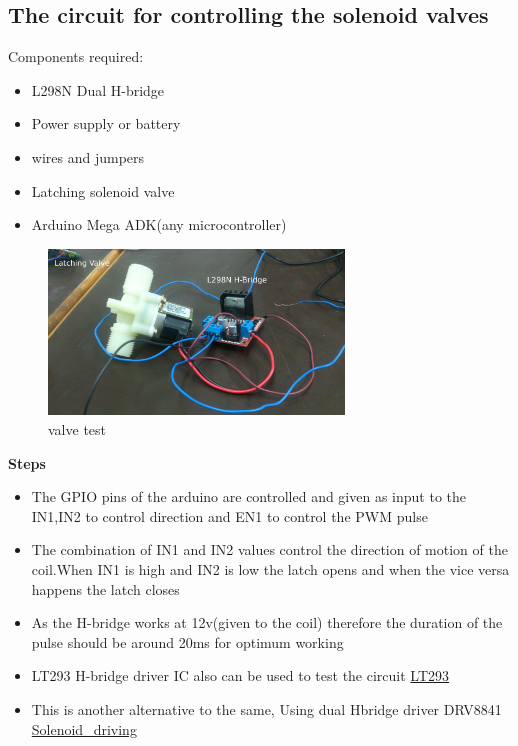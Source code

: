 \documentclass[16pt]{article}
\begin{document}
\vspace{0.5cm}

\subsection{The circuit for controlling the solenoid valves}

Components required:

\begin{itemize}

\item
  L298N Dual H-bridge
\item
  Power supply or battery
\item
  wires and jumpers
\item
  Latching solenoid valve
\item
  Arduino Mega ADK(any microcontroller)
\end{itemize}


\begin{figure}

\hspace{2cm}
\includegraphics[width=0.7\textwidth]{images/valve.jpg}
\caption{valve test}
\end{figure}

\textbf{Steps}

\begin{itemize}

\item
  The GPIO pins of the arduino are controlled and given as input to the
  IN1,IN2 to control direction and EN1 to control the PWM pulse
\item
  The combination of IN1 and IN2 values control the direction of motion
  of the coil.When IN1 is high and IN2 is low the latch opens and when
  the vice versa happens the latch closes
\item
  As the H-bridge works at 12v(given to the coil) therefore the duration
  of the pulse should be around 20ms for optimum working
\item
  LT293 H-bridge driver IC also can be used to test the
  circuit \href{http://www.ti.com/lit/ds/symlink/l293.pdf}{LT293}
\item
  This is another alternative to the same, Using dual Hbridge driver
  DRV8841
  \href{http://www.ti.com/lit/an/slva460/slva460.pdf}{Solenoid\_driving}
\end{itemize}
\end{document}
